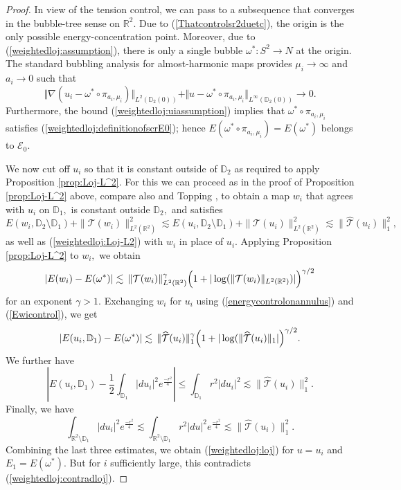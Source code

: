 \documentclass[10pt,reqno]{amsart}
\theoremstyle{plain}
\theoremstyle{definition}
\numberwithin{equation}{section}
\newcommand{\ga}{\gamma}
\newcommand{\om}{\omega}
\newcommand{\D}{\mathbb{D}}
\newcommand{\R}{\ensuremath{{\mathbb R}}}
\newcommand{\T}{{\mathcal T}}
\newcommand{\That}{{ \widehat{\T} }}
\newcommand{\norm}[1]{\Vert#1\Vert}
\newcommand{\beq}{\begin{equation}}
\newcommand{\eeq}{\end{equation}}
\newcommand{\abs}[1]{\vert#1\vert}
\newcommand{\na}{\nabla}
\begin{document}
\begin{proof}
In view of the tension control, we can pass to a subsequence that converges in the bubble-tree sense on $\R^2.$ Due to (\ref{Thatcontrolsr2duetc}), the origin is the only possible energy-concentration point. 
Moreover, due to (\ref{weightedloj:assumption}), there is only a single bubble $\omega^*:S^2\to N$ at the origin. The standard bubbling analysis for almost-harmonic maps provides $\mu_i \to \infty$ and $a_i \to 0$ such that
\beq
\label{weightedloj:Loj-L2}
\norm{\na(u_i-\om^*\circ \pi_{a_i,\mu_i})}_{L^2(\D_2(0))} + \norm{u-\om^*\circ \pi_{a_i,\mu_i}}_{L^\infty(\D_2(0))}
\to 0.
\eeq
Furthermore, the bound (\ref{weightedloj:uiassumption}) implies that $\om^*\circ \pi_{a_i,\mu_i}$ satisfies (\ref{weightedloj:definitionofscrE0}); hence $E(\om^*\circ \pi_{a_i,\mu_i}) = E(\omega^*)$ belongs to $\mathcal{E}_0.$

We now cut off $u_i$ so that it is constant outside of $\D_2$ as required to apply Proposition \ref{prop:Loj-L^2}. For this we can proceed as in the proof of Proposition \ref{prop:Loj-L^2} above, compare also \cite[Lemma 3.7]{waldronlojonS2} and Topping \cite[Lemma 2.23]{toppingannals}, to obtain a map $w_i$ that agrees with $u_i$ on $\D_1,$ is constant outside $\D_2,$ and satisfies
\begin{equation}\label{Ewicontrol}
E(w_i, \D_2 \setminus \D_1) + \|\T(w_i) \|_{L^2(\R^2)}^2 \lesssim E(u_i, \D_2 \setminus \D_1) + \|\T(u_i) \|_{L^2(\R^2)}^2 \lesssim \| \That(u_i)\|_{1}^2,
\end{equation}
as well as (\ref{weightedloj:Loj-L2}) with $w_i$ in place of $u_i.$ Applying Proposition \ref{prop:Loj-L^2} to $w_i,$ we obtain
\begin{equation*}
    |E(w_i) - E(\omega^*)| \lesssim \,\norm{\T(w_i)}_{L^2(\R^2)}^{\ga}
\Bigl(1+\abs{\log(\norm{\T(w_i)}_{L^2(\R^2)})}\Bigr)^{\ga/2}
\end{equation*}
for an exponent $\gamma > 1.$
Exchanging $w_i$ for $u_i$ using (\ref{energycontrolonannulus}) and (\ref{Ewicontrol}), we get
\begin{equation*}
    |E(u_i, \D_1) - E(\omega^*)| \lesssim \,\norm{\That(u_i)}_{1}^{\ga}
\Bigl(1+\abs{\log(\norm{\That(u_i)}_{1}}\Bigr)^{\ga/2}.
\end{equation*}
We further have
$$\left| E(u_i, \D_1) - \frac12 \int_{\D_1} |du_i|^2 e^{\frac{-r^2}{4}} \right| \leq \int_{\D_1} r^2 |du_i|^2 \lesssim \| \That(u_i) \|_1^{2}.$$
Finally, we have
$$\int_{\R^2 \setminus \D_1} |du_i|^2 e^{\frac{-r^2}{4}} \lesssim \int_{\R^2 \setminus \D_1} r^2 |du|^2 e^{\frac{-r^2}{4}} \lesssim \| \That(u_i) \|_1^{2}.$$
Combining the last three estimates, we obtain (\ref{weightedloj:loj}) for $u = u_i$ and $E_1 = E(\omega^*).$ But for $i$ sufficiently large, this contradicts (\ref{weightedloj:contradloj}).
\end{proof}
\end{document}
